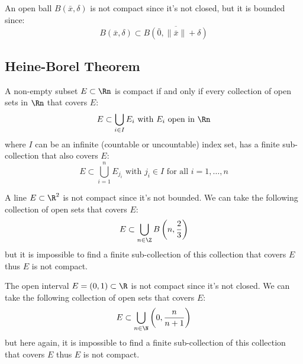 \begin{eg}
    An open ball $B(\bar{x}, \delta)$ is not compact since it's not closed, but it is bounded since:
    \[
        B(\bar{x}, \delta) \subset \overline{B(\bar{0}, \| \bar{x} \| + \delta)}
    \]
\end{eg}

\subsection{Heine-Borel Theorem}
\begin{theorem}
    A non-empty subset $E \subset \Rn$ is compact if and only if every collection of open sets in $\Rn$ that covers $E$:
    \[
        E \subset \bigcup_{i \in I} E_i \text{ with } E_i \text{ open in } \Rn
    \]
    where $I$ can be an infinite (countable or uncountable) index set, has a finite sub-collection that also covers $E$:
    \[
        E \subset \bigcup_{i = 1}^n E_{j_i} \text{ with } j_i \in I \text{ for all } i = 1, \ldots, n
    \]
\end{theorem}

\begin{eg}
    A line $E \subset \R^2$ is not compact since it's not bounded. We can take the following collection of open sets that covers $E$:
    \[
        E \subset \bigcup_{n \in \Z} B\left(n, \frac{2}{3}\right)
    \]
    but it is impossible to find a finite sub-collection of this collection that covers $E$ thus $E$ is not compact.
\end{eg}

\begin{eg}
    The open interval $E = (0,1) \subset \R$ is not compact since it's not closed. We can take the following collection of open sets that covers $E$:
    \[
        E \subset \bigcup_{n \in \N} \left(0, \frac{n}{n + 1}\right)
    \]
    but here again, it is impossible to find a finite sub-collection of this collection that covers $E$ thus $E$ is not compact.
\end{eg}


